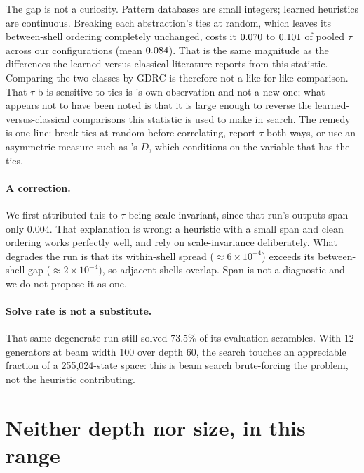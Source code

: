 \documentclass{article}
\begin{document}
The gap is not a curiosity. Pattern databases are small integers; learned
heuristics are continuous. Breaking each abstraction's ties at random, which
leaves its between-shell ordering completely unchanged, costs it $0.070$ to
$0.101$ of pooled $\tau$ across our configurations (mean $0.084$). That is the
same magnitude as the differences the learned-versus-classical literature
reports from this statistic. Comparing the two classes by GDRC is therefore not a
like-for-like comparison. That $\tau$-b is sensitive to ties is
\citet{kendall1945}'s own observation and not a new one; what appears not to have
been noted is that it is large enough to reverse the learned-versus-classical
comparisons this statistic is used to make in search. The remedy is one line:
break ties at random before correlating, report $\tau$ both ways, or use an
asymmetric measure such as \citet{somers1962}'s $D$, which conditions on the
variable that has the ties.

\paragraph{A correction.} We first attributed this to $\tau$ being
scale-invariant, since that run's outputs span only $0.004$. That explanation is
wrong: a heuristic with a small span and clean ordering works perfectly well, and
\citet{wilt2016} rely on scale-invariance deliberately. What degrades the run is
that its within-shell spread ($\approx 6\times10^{-4}$) exceeds its between-shell
gap ($\approx 2\times10^{-4}$), so adjacent shells overlap. Span is not a
diagnostic and we do not propose it as one.

\paragraph{Solve rate is not a substitute.} That same degenerate run still solved
73.5\% of its evaluation scrambles. With 12 generators at beam width 100 over
depth 60, the search touches an appreciable fraction of a 255{,}024-state space:
this is beam search brute-forcing the problem, not the heuristic contributing.

\section{Neither depth nor size, in this range}
\label{sec:depth}

\begin{table}[t]\centering
\caption{Rung $k=4$ at four generating sets. Every row has exactly 255{,}024
reachable states, verified by exhaustive search; only the diameter differs. Ten
seeds each, identical 12{,}000-step budget.}
\label{tab:depth}\end{table}
\end{document}

